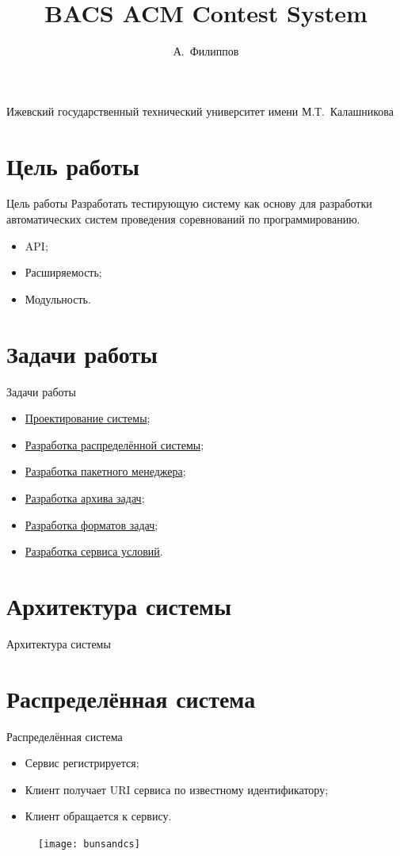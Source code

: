 \documentclass[xetex,mathserif,serif,10pt]{beamer}
\newenvironment{sframe}[2]{\section{#1}\begin{frame}[label=#2]{#1}}{\end{frame}}
\begin{document}
    \title[BACS]{BACS ACM Contest System}
    \author[Филиппов]{А.~Филиппов}
    \institute
    {
        Ижевский государственный технический университет имени М.Т.~Калашникова
    }

    

    \begin{sframe}{Цель работы}{target}
        Разработать тестирующую систему как основу для разработки
        автоматических систем проведения соревнований по программированию.

        \begin{itemize}
            \item API;
            \item Расширяемость;
            \item Модульность.
        \end{itemize}
    \end{sframe}

    \begin{sframe}{Задачи работы}{problems}
        \begin{itemize}
            \item \hyperlink{systemdesign}{Проектирование системы};
            \item \hyperlink{dcs}{Разработка распределённой системы};
            \item \hyperlink{bunsanpm}{Разработка пакетного менеджера};
            \item \hyperlink{bacsarchive}{Разработка архива задач};
            \item \hyperlink{bacsproblem}{Разработка форматов задач};
            \item \hyperlink{bacsstatementprovider}{Разработка сервиса условий}.
        \end{itemize}
    \end{sframe}

    \begin{sframe}{Архитектура системы}{systemdesign}
        \begin{figure}
            \resizebox{\columnwidth}{!}{
                
            }
        \end{figure}
    \end{sframe}

    \begin{sframe}{Распределённая система}{dcs}
        \begin{itemize}
            \item Сервис регистрируется;
            \item Клиент получает URI сервиса по известному идентификатору;
            \item Клиент обращается к сервису.
        \end{itemize}
        \begin{figure}
            \centering
            \texttt{[image: bunsandcs]}
        \end{figure}
    \end{sframe}
\end{document}
